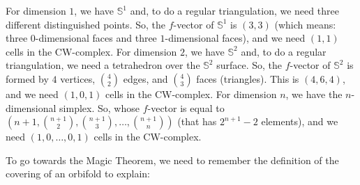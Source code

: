\documentclass[12pt,a4paper,oneside]{article}
\numberwithin{equation}{section}
\theoremstyle{definition}
\begin{document}
For dimension $1$, we have $\mathbb{S}^{1}$ and, to do a regular triangulation, we need three different distinguished points. So, the $f$-vector of $\mathbb{S}^{1}$ is $(3, 3)$ (which means: three $0$-dimensional faces and three $1$-dimensional faces), and we need $(1, 1)$ cells in the CW-complex. \newline
For dimension $2$, we have $\mathbb{S}^{2}$ and, to do a regular triangulation, we need a tetrahedron over the $\mathbb{S}^{2}$ surface. So, the $f$-vector of $\mathbb{S}^{2}$ is formed by $4$ vertices, $\binom{4}{2}$ edges, and $\binom{4}{3}$ faces (triangles). This is $(4, 6, 4)$, and we need $(1, 0, 1)$ cells in the CW-complex. \newline
For dimension $n$, we have the $n$-dimensional simplex. So, whose $f$-vector is equal to $(n + 1, \binom{n+1}{2}, \binom{n+1}{3}, \ldots, \binom{n+1}{n})$ (that has $2^{n+1}-2$ elements), and we need $(1, 0, \ldots, 0, 1)$ cells in the CW-complex. \newline

To go towards the Magic Theorem, we need to remember the definition of the covering of an orbifold to explain: \newline
\end{document}
